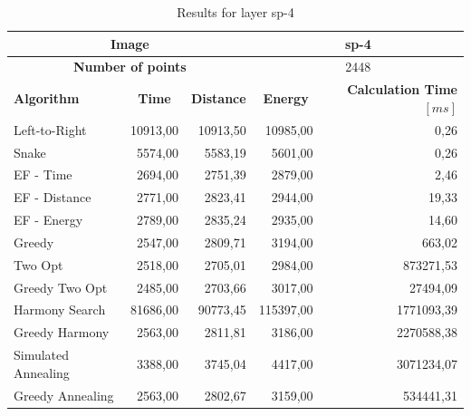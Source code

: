 \documentclass[titlepage]{article}
\begin{document}
\begin{table}[H]
	\begin{center}
		\begin{tabular}{|m{4cm}||r|r|r|r|}
			\hline

			\multicolumn{3}{|c|}{ 			\cellcolor[gray]{0.7} \textbf{Image}} & \multicolumn{2}{|c|}{sp-4} \\ \hline
			\multicolumn{3}{|c|}{ \cellcolor[gray]{0.7} \textbf{Number of points}} & \multicolumn{2}{|c|}{2448} \\ \hline \hline
			
			\rowcolor{gray!30}
			
			\textbf{Algorithm} & \multicolumn{1}{|c|}{\textbf{Time}} & \multicolumn{1}{|c|}{\textbf{Distance}} & \multicolumn{1}{|c|}{\textbf{Energy}} & \multicolumn{1}{|p{2.5cm}|}{\textbf{Calculation Time $[ms]$}} \\ \hline
				
			Left-to-Right	 & 10913,00 	& 10913,50		& 10985,00 	& 0,26
			 \\ \cline{2-5}
			
			Snake	 & 5574,00		& 5583,19		& 5601,00		& 0,26
			 \\ \cline{2-5}
			
			EF - Time & 2694,00	& 2751,39	& \cellcolor{yellow!80} 2879,00	& 2,46
			  \\ \cline{2-5}
			
			EF - Distance & 2771,00	& 2823,41	& 2944,00 &	19,33
			  \\ \cline{2-5}
			
			EF - Energy & 2789,00 &	2835,24	& 2935,00	& 14,60
			 \\ \cline{2-5}
			
			Greedy &   2547,00	& 2809,71 & 	3194,00	& 663,02
			 \\ \cline{2-5}
			
			Two Opt & 2518,00 &	2705,01	& 2984,00	& 873271,53
			 \\ \cline{2-5}
			
			 Greedy Two Opt & \cellcolor{yellow!80} 2485,00	& \cellcolor{yellow!80} 2703,66	& 3017,00	& 27494,09
			  \\ \cline{2-5}
			
			Harmony Search & 81686,00	& 90773,45	& 115397,00	& 1771093,39
			  \\ \cline{2-5}
			
			Greedy Harmony & 2563,00	& 2811,81	& 3186,00	& 2270588,38
			  \\ \cline{2-5}
			
			Simulated Annealing & 3388,00	& 3745,04	& 4417,00	& 3071234,07
			  \\ \cline{2-5}
			
			Greedy Annealing & 2563,00	& 2802,67	& 3159,00	& 534441,31
			 \\ \hline
			
		\end{tabular}
		\caption{Results for layer sp-4}
		\label{tab:results-sp-4}
	\end{center}
\end{table}
\end{document}
